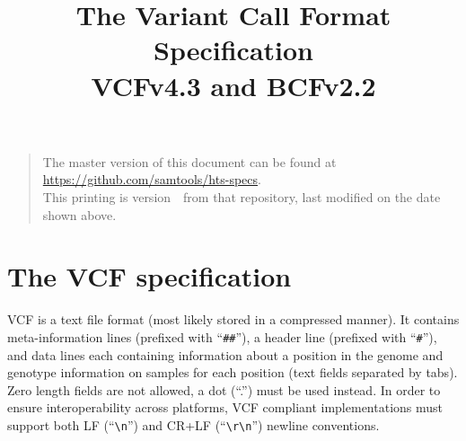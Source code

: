 \documentclass[8pt]{article}
\begin{document}

\title{The Variant Call Format Specification \\ \vspace{0.5em} \large VCFv4.3 and BCFv2.2}
\date{\headdate}
\maketitle
\begin{quote}\small
The master version of this document can be found at \url{https://github.com/samtools/hts-specs}.\\
This printing is version~\commitdesc\ from that repository, last modified on the date shown above.
\end{quote}
\vspace*{1em}

\newpage
\tableofcontents
\newpage

\section{The VCF specification}
VCF is a text file format (most likely stored in a compressed manner).
It contains meta-information lines (prefixed with ``\verb|##|''), a header line (prefixed with ``\verb|#|''), and data lines each containing information about a position in the genome and genotype information on samples for each position (text fields separated by tabs).
Zero length fields are not allowed, a dot (``.'') must be used instead.
In order to ensure interoperability across platforms, VCF compliant implementations must support both LF (``\verb|\n|'') and CR+LF (``\verb|\r\n|'') newline conventions.
\end{document}
